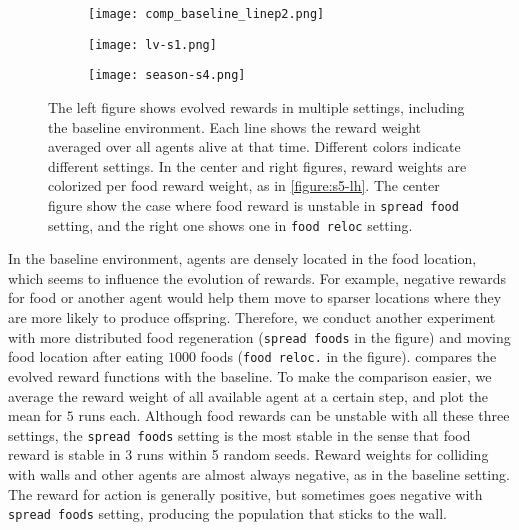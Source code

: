 \begin{figure}[t]
  \begin{subfigure}[t]{6cm}
    \centering
    \texttt{[image: comp\_baseline\_linep2.png]}
    \label{subfigure:blcomp}
  \end{subfigure}
  \begin{subfigure}[t]{4.5cm}
    \centering
    \texttt{[image: lv-s1.png]}
    \label{subfigure:lv1}
  \end{subfigure}
  \begin{subfigure}[t]{4.5cm}
    \centering
    \texttt{[image: season-s4.png]}
    \label{subfigure:season4}
  \end{subfigure}
  \caption{
    The left figure shows evolved rewards in multiple settings, including the baseline environment.
    Each line shows the reward weight averaged over all agents alive at that time.
    Different colors indicate different settings.
    In the center and right figures, reward weights are colorized per food reward weight, as in \cref{figure:s5-lh}. The center figure show the case where food reward is unstable in \texttt{spread food} setting, and the right one shows one in \texttt{food reloc} setting.
    \label{figure:foodloc-comp}
  }
\end{figure}

In the baseline environment, agents are densely located in the food location, which seems to influence the evolution of rewards. For example, negative rewards for food or another agent would help them move to sparser locations where they are more likely to produce offspring. Therefore, we conduct another experiment with more distributed food regeneration (\texttt{spread foods} in the figure) and moving food location after eating $1000$ foods (\texttt{food reloc.} in the figure).  compares the evolved reward functions with the baseline. To make the comparison easier, we average the reward weight of all available agent at a certain step, and plot the mean for $5$ runs each. Although food rewards can be unstable with all these three settings, the \texttt{spread foods} setting is the most stable in the sense that food reward is stable in 3 runs within 5 random seeds. Reward weights for colliding with walls and other agents are almost always negative, as in the baseline setting. The reward for action is generally positive, but sometimes goes negative with \texttt{spread foods} setting, producing the population that sticks to the wall.

